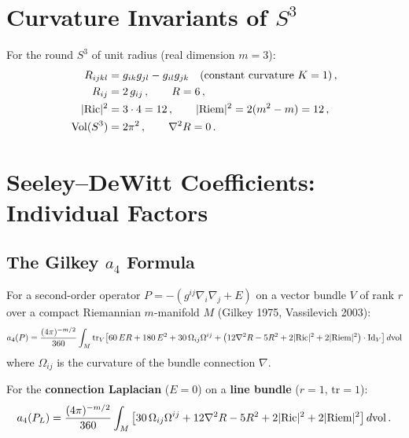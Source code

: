\documentclass[12pt,a4paper]{article}
\theoremstyle{definition}
\begin{document}
\section{Curvature Invariants of $S^3$}
\label{sec:S3}

For the round $S^3$ of unit radius (real dimension $m = 3$):
\begin{equation}
\begin{aligned}
R_{ijkl} &= g_{ik}g_{jl} - g_{il}g_{jk}\quad\text{(constant curvature $K = 1$)}\,, \\
R_{ij} &= 2\,g_{ij}\,,\qquad R = 6\,, \\
|{\rm Ric}|^2 &= 3 \cdot 4 = 12\,,\qquad
|{\rm Riem}|^2 = 2(m^2 - m) = 12\,, \\
\mathrm{Vol}(S^3) &= 2\pi^2\,,\qquad \nabla^2 R = 0\,.
\end{aligned}
\end{equation}

\section{Seeley--DeWitt Coefficients: Individual Factors}
\label{sec:SDW-individual}

\subsection{The Gilkey $a_4$ Formula}

For a second-order operator $P = -(g^{ij}\nabla_i\nabla_j + E)$ on a
vector bundle $V$ of rank $r$ over a compact Riemannian $m$-manifold $M$
(Gilkey 1975, Vassilevich 2003):
\begin{equation}\label{eq:Gilkey-a4}
a_4(P) = \frac{(4\pi)^{-m/2}}{360}\int_M \mathrm{tr}_V\!\left[
60\,ER + 180\,E^2 + 30\,\Omega_{ij}\Omega^{ij}
+ \bigl(12\nabla^2 R - 5R^2 + 2|{\rm Ric}|^2 + 2|{\rm Riem}|^2\bigr)\cdot\mathrm{Id}_V
\right]d\mathrm{vol}
\end{equation}
where $\Omega_{ij}$ is the curvature of the bundle connection $\nabla$.

For the \textbf{connection Laplacian} ($E = 0$) on a \textbf{line bundle}
($r = 1$, $\mathrm{tr} = 1$):
\begin{equation}\label{eq:a4-conn-lap}
a_4(P_L) = \frac{(4\pi)^{-m/2}}{360}\int_M\left[
30\,\Omega_{ij}\Omega^{ij}
+ 12\nabla^2 R - 5R^2 + 2|{\rm Ric}|^2 + 2|{\rm Riem}|^2
\right]d\mathrm{vol}\,.
\end{equation}
\end{document}
